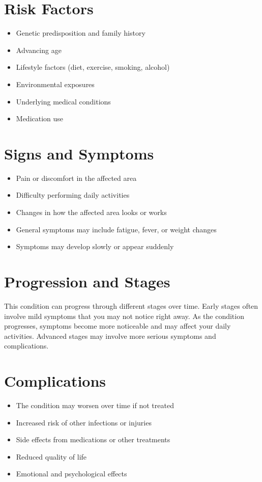 \section{Risk Factors}

\begin{itemize}[noitemsep]
  \item Genetic predisposition and family history
  \item Advancing age
  \item Lifestyle factors (diet, exercise, smoking, alcohol)
  \item Environmental exposures
  \item Underlying medical conditions
  \item Medication use
\end{itemize}

\section{Signs and Symptoms}

\begin{itemize}[noitemsep]
  \item Pain or discomfort in the affected area
  \item Difficulty performing daily activities
  \item Changes in how the affected area looks or works
  \item General symptoms may include fatigue, fever, or weight changes
  \item Symptoms may develop slowly or appear suddenly
\end{itemize}

\section{Progression and Stages}
This condition can progress through different stages over time. Early stages often involve mild symptoms that you may not notice right away. As the condition progresses, symptoms become more noticeable and may affect your daily activities. Advanced stages may involve more serious symptoms and complications.

\section{Complications}

\begin{itemize}[noitemsep]
  \item The condition may worsen over time if not treated
  \item Increased risk of other infections or injuries
  \item Side effects from medications or other treatments
  \item Reduced quality of life
  \item Emotional and psychological effects
\end{itemize}

